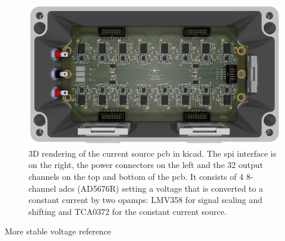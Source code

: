 \begin{figure}[hbt]
    \centering
    
    \caption{ }
\end{figure}

\begin{figure}[hbt]
    \centering
    
    \caption{ }
\end{figure}


\begin{figure}[hbt]
    \centering
    \includegraphics[width=\textwidth]{images/32-channel_current_source.png}
    \caption{ 3D rendering of the current source \acrshort{pcb} in \gls{kicad}. The \acrshort{spi} interface is on the right, the power connectors on the left and the 32 output channels on the top and bottom of the \acrshort{pcb}. It consists of 4 8-channel \acrshort{adc}s (AD5676R) setting a voltage that is converted to a constant current by two \acrshort{opamp}s: LMV358 for signal scaling and shifting and TCA0372 for the constant current source.}
\end{figure}

More stable voltage reference

\begin{figure}[hbt]
    \centering
    
    \caption{ }
\end{figure}

